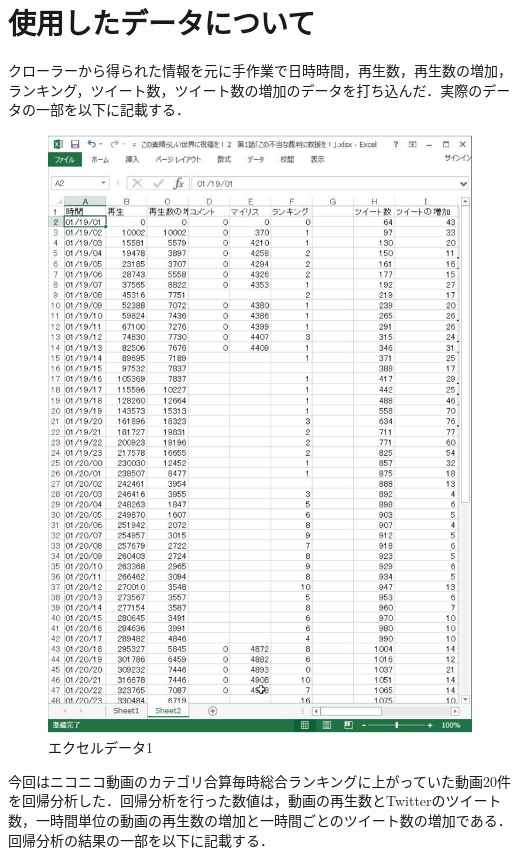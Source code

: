\section{使用したデータについて}

クローラーから得られた情報を元に手作業で日時時間，再生数，再生数の増加，ランキング，ツイート数，ツイート数の増加のデータを打ち込んだ．実際のデータの一部を以下に記載する．

\begin{figure}[htb]
\centering
\includegraphics[width=12cm]{de-ta01.pdf}
\caption{エクセルデータ1}\label{ace}
\end{figure}

\clearpage

今回はニコニコ動画のカテゴリ合算毎時総合ランキングに上がっていた動画20件を回帰分析した．回帰分析を行った数値は，動画の再生数とTwitterのツイート数，一時間単位の動画の再生数の増加と一時間ごとのツイート数の増加である．回帰分析の結果の一部を以下に記載する．

